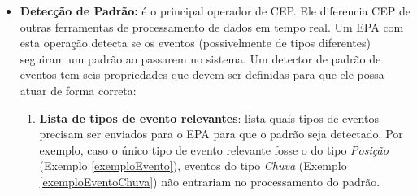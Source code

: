 \begin{itemize}
\item \textbf{Detecção de Padrão:} é o principal operador de CEP. Ele diferencia CEP de outras ferramentas de processamento de dados em tempo real. Um EPA com esta operação detecta se os eventos (possivelmente de tipos diferentes) seguiram um padrão ao passarem no sistema. Um detector de padrão de eventos tem seis propriedades que devem ser definidas para que ele possa atuar de forma correta: 
\begin{enumerate}
\item \textbf{Lista de tipos de evento relevantes}: lista quais tipos de eventos precisam ser enviados para o EPA para que o padrão seja detectado. %
Por exemplo, caso o único tipo de evento relevante fosse o do tipo \textit{Posição} (Exemplo \ref{exemploEvento}), eventos do tipo \textit{Chuva} (Exemplo \ref{exemploEventoChuva}) não entrariam no processamento do padrão. 



\end{enumerate}
\end{itemize}

